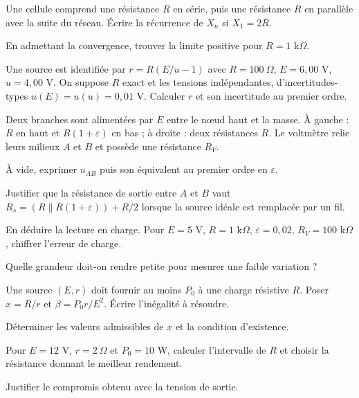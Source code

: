 \begin{questions}
\item Une cellule comprend une résistance $R$ en série, puis une résistance $R$ en parallèle avec la suite du réseau. Écrire la récurrence de $X_n$ si $X_1=2R$.
\item En admettant la convergence, trouver la limite positive pour $R=1$ k$\Omega$.
\end{questions}

\begin{questions}
\item Une source est identifiée par $r=R(E/u-1)$ avec $R=100\ \Omega$, $E=6{,}00$ V, $u=4{,}00$ V. On suppose $R$ exact et les tensions indépendantes, d’incertitudes-types $u(E)=u(u)=0{,}01$ V. Calculer $r$ et son incertitude au premier ordre.
\end{questions}



\label{ch02-ex-D1}
Deux branches sont alimentées par $E$ entre le nœud haut et la masse. À gauche : $R$ en haut et $R(1+\varepsilon)$ en bas ; à droite : deux résistances $R$. Le voltmètre relie leurs milieux $A$ et $B$ et possède une résistance $R_V$.
\begin{questions}
\item À vide, exprimer $u_{AB}$ puis son équivalent au premier ordre en $\varepsilon$.
\item Justifier que la résistance de sortie entre $A$ et $B$ vaut $R_s=(R\parallel R(1+\varepsilon))+R/2$ lorsque la source idéale est remplacée par un fil.
\item En déduire la lecture en charge. Pour $E=5$ V, $R=1$ k$\Omega$, $\varepsilon=0{,}02$, $R_V=100$ k$\Omega$, chiffrer l’erreur de charge.
\item Quelle grandeur doit-on rendre petite pour mesurer une faible variation ?
\end{questions}


\label{ch02-ex-D2}
\begin{questions}
\item Une source $(E,r)$ doit fournir au moins $P_0$ à une charge résistive $R$. Poser $x=R/r$ et $\beta=P_0r/E^2$. Écrire l’inégalité à résoudre.
\item Déterminer les valeurs admissibles de $x$ et la condition d’existence.
\item Pour $E=12$ V, $r=2\ \Omega$ et $P_0=10$ W, calculer l’intervalle de $R$ et choisir la résistance donnant le meilleur rendement.
\item Justifier le compromis obtenu avec la tension de sortie.
\end{questions}


